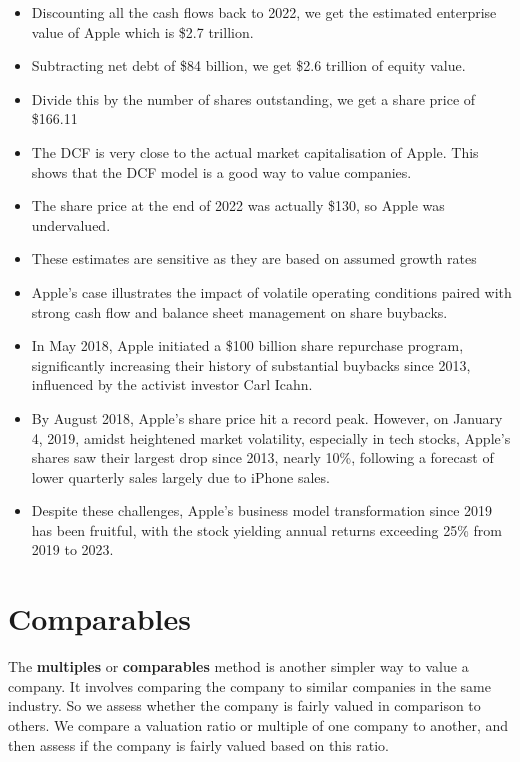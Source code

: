 \begin{itemize}
    \item Discounting all the cash flows back to 2022, we get the estimated enterprise value of Apple which is \$2.7 trillion. 
    \item Subtracting net debt of \$84 billion, we get \$2.6 trillion of equity value. 
    \item Divide this by the number of shares outstanding, we get a share price of \$166.11
    \item The DCF is very close to the actual market capitalisation of Apple. This shows that the DCF model is a good way to value companies.
    \item The share price at the end of 2022 was actually \$130, so Apple was undervalued.
    \item These estimates are sensitive as they are based on assumed growth rates
    \item Apple's case illustrates the impact of volatile operating conditions paired with strong cash flow and balance sheet management on share buybacks.
    \item In May 2018, Apple initiated a \$100 billion share repurchase program, significantly increasing their history of substantial buybacks since 2013, influenced by the activist investor Carl Icahn.
    \item By August 2018, Apple's share price hit a record peak. However, on January 4, 2019, amidst heightened market volatility, especially in tech stocks, Apple's shares saw their largest drop since 2013, nearly 10\%, following a forecast of lower quarterly sales largely due to iPhone sales.
    \item Despite these challenges, Apple's business model transformation since 2019 has been fruitful, with the stock yielding annual returns exceeding 25\% from 2019 to 2023.
  \end{itemize}

\section{Comparables}

The \textbf{multiples} or \textbf{comparables} method is another simpler way to value a company. It involves comparing the company to similar companies in the same industry. So we assess whether the company is fairly valued in comparison to others. We compare a valuation ratio or multiple of one company to another, and then assess if the company is fairly valued based on this ratio.\\

